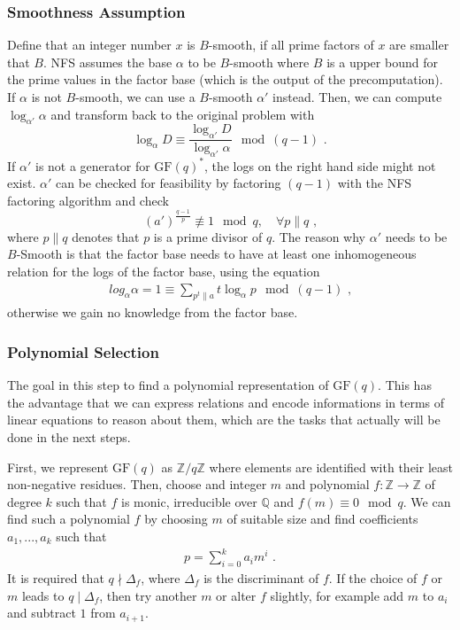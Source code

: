 \documentclass[paper=a4, fontsize=11pt]{scrartcl} %
\numberwithin{equation}{section} %
\numberwithin{figure}{section} %
\numberwithin{table}{section} %
\begin{document}
\subsubsection{Smoothness Assumption}
Define that an integer number $x$ is $B$-smooth, if all prime factors of $x$ are smaller that $B$. NFS assumes the base $\alpha$ to be $B$-smooth where $B$ is a upper bound for the prime values in the factor base (which is the output of the precomputation). If $\alpha$ is not $B$-smooth, we can use a $B$-smooth $\alpha'$ instead. Then, we can compute $\log_{\alpha'}\alpha$ and transform back to the original problem with
\begin{equation}
\log_\alpha D\equiv\frac{\log_{\alpha'}D}{\log_{\alpha'}\alpha}\mod (q-1)
\text{ .}
\end{equation}
If $\alpha'$ is not a generator for $\mathrm{GF}(q)^*$, the logs on the right hand side might not exist. $\alpha'$ can be checked for feasibility by factoring $(q-1)$ with the NFS factoring algorithm and check
\begin{equation}
(a')^{\frac{q-1}{p}} \not\equiv 1 \mod q,\quad\forall p\parallel q
\text{ ,}
\end{equation}
where $p\parallel q$ denotes that $p$ is a prime divisor of $q$. The reason why $\alpha'$ needs to be $B$-Smooth is that the factor base needs to have at least one inhomogeneous relation for the logs of the factor base, using the equation
\begin{eqnarray}
log_\alpha\alpha = 1 \equiv \sum_{p^t\parallel a}t\log_\alpha p \mod (q-1)
\text{ ,}
\end{eqnarray}
otherwise we gain no knowledge from the factor base.

\subsubsection{Polynomial Selection}
The goal in this step to find a polynomial representation of $\mathrm{GF}(q)$. This has the advantage that we can express relations and encode informations in terms of linear equations to reason about them, which are the tasks that actually will be done in the next steps.

First, we represent $\mathrm{GF}(q)$ as $\mathbb{Z}/q\mathbb{Z}$ where elements are identified with their least non-negative residues. Then, choose and integer $m$ and polynomial $f:\mathbb{Z}\rightarrow\mathbb{Z}$ of degree $k$ such that $f$ is monic, irreducible over $\mathbb{Q}$ and $f(m)\equiv 0 \mod q$. We can find such a polynomial $f$ by choosing $m$ of suitable size and find coefficients $a_1,...,a_k$ such that
\begin{eqnarray}
p = \sum_{i=0}^{k}a_im^i
\text{ .}
\end{eqnarray}
It is required that $q\nmid\Delta_f$, where $\Delta_f$ is the discriminant of $f$. If the choice of $f$ or $m$ leads to $q\mid\Delta_f$, then try another $m$ or alter $f$ slightly, for example add $m$ to $a_i$ and subtract $1$ from $a_{i+1}$.
\end{document}
